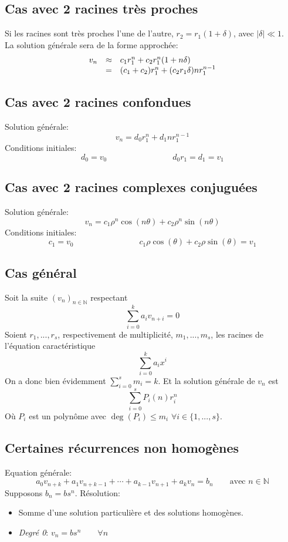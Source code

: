 \subsection{Cas avec 2 racines très proches}
Si les racines sont très proches l'une de l'autre, $r_2 = r_1(1 + \delta )$, avec $|\delta | \ll 1$.\\
 La solution générale sera de la forme approchée:
\[
\begin{array}{r c l}
v_n &\approx &c_1r_1^n + c_2r_1^n(1 + n\delta)\\
&=&(c_1 + c_2)r_1^n + (c_2r_1\delta )nr_1^{n-1}\\
\end{array}
\]

\subsection{Cas avec 2 racines confondues}
Solution générale:
\[v_n = d_0r_1^n + d_1nr_1^{n-1}\]
Conditions initiales:
\[d_0 = v_0 \qquad{\qquad{\qquad{\qquad}}} d_0r_1 = d_1 = v_1\]
\subsection{Cas avec 2 racines complexes conjuguées}
Solution générale:
\[v_n = c_1\rho{^n}\cos{(n\theta)} + c_2\rho{^n}\sin{(n\theta)}\]
Conditions initiales:
\[c_1 = v_0 \qquad{\qquad{\qquad{\qquad}}} c_1\rho\cos{(\theta)} + c_2\rho\sin{(\theta)} = v_1\]

\subsection{Cas général}
Soit la suite $(v_n)_{n \in \mathbb{N}}$ respectant
\[\sum_{i = 0}^{k} a_i v_{n + i} = 0\]
Soient $r_1, ..., r_s$, respectivement de multiplicité, $m_1, ..., m_s$, les racines de l'équation caractéristique
\[\sum_{i = 0}^{k} a_i x^{i}\]
On a donc bien évidemment $\sum_{i = 0}^{s} m_i = k$. Et la solution générale de $v_n$ est
$$\sum_{i=0}^{s} P_i(n)r_{i}^{n}$$
Où $P_i$ est un polynôme avec $\deg(P_i) \leq m_i$ $\forall i \in \{1, ..., s\}$.

\subsection{Certaines récurrences non homogènes}
Equation générale:
\[a_0v_{n+k} + a_1v_{n+k-1} + \cdots + a_{k-1}v_{n+1} + a_kv_n = b_n \qquad \text{avec }n \in \mathbb{N}\]
Supposons $b_n = bs^n$.
Résolution:\\
\begin{itemize}
\item Somme d'une solution particulière et des solutions homogènes.\\
\item \emph{Degré 0}: $v_n = bs^n \qquad \forall n$\\
\end{itemize}

